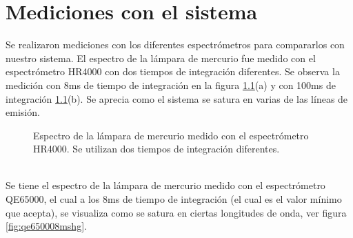 \chapter{Mediciones con el sistema}
Se realizaron mediciones con los diferentes espectrómetros para compararlos con nuestro sistema. El espectro de la lámpara de mercurio fue medido con el espectrómetro HR4000 con dos tiempos de integración diferentes. Se observa la medición con 8ms de tiempo de integración en la figura \ref{fig:hr40004ms}(a) y con 100ms de integración \ref{fig:hr40004ms}(b). Se aprecia como el sistema se satura en varias de las líneas de emisión.
\begin{figure}[h]
	\centering
	\caption{Espectro de la lámpara de mercurio medido con el espectrómetro HR4000. Se utilizan dos tiempos de integración diferentes.}
	\label{fig:hr40004ms}
\end{figure}
\\
Se tiene el espectro de la lámpara de mercurio medido con el espectrómetro QE65000, el cual a los 8ms de tiempo de integración (el cual es el valor mínimo que acepta), se visualiza como se satura en ciertas longitudes de onda, ver figura \ref{fig:qe650008mshg}.
